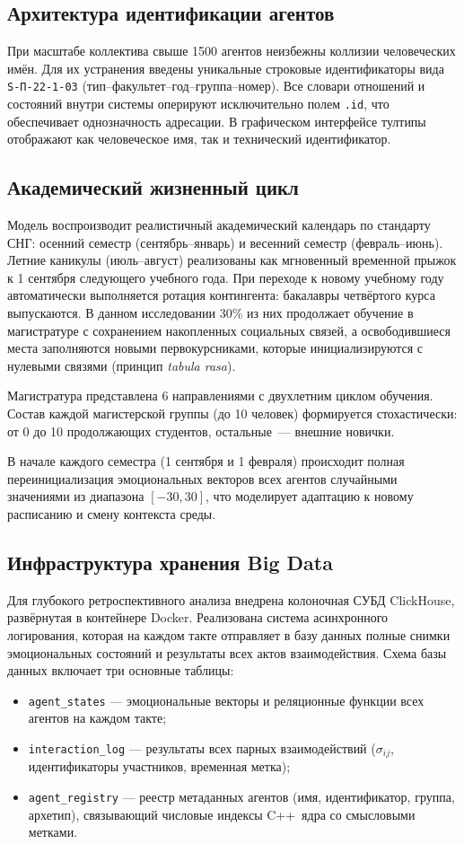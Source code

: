 \documentclass[12pt]{article}
\begin{document}
\subsection{Архитектура идентификации агентов}
При масштабе коллектива свыше 1500 агентов неизбежны коллизии человеческих имён. Для их устранения введены уникальные строковые идентификаторы вида \texttt{S-П-22-1-03} (тип--факультет--год--группа--номер). Все словари отношений и состояний внутри системы оперируют исключительно полем \texttt{.id}, что обеспечивает однозначность адресации. В графическом интерфейсе тултипы отображают как человеческое имя, так и технический идентификатор.

\subsection{Академический жизненный цикл}
Модель воспроизводит реалистичный академический календарь по стандарту СНГ: осенний семестр (сентябрь--январь) и весенний семестр (февраль--июнь). Летние каникулы (июль--август) реализованы как мгновенный временной прыжок к 1 сентября следующего учебного года. При переходе к новому учебному году автоматически выполняется ротация контингента: бакалавры четвёртого курса выпускаются. В данном исследовании 30\% из них продолжает обучение в магистратуре с сохранением накопленных социальных связей, а освободившиеся места заполняются новыми первокурсниками, которые инициализируются с нулевыми связями (принцип \textit{tabula rasa}).

Магистратура представлена 6 направлениями с двухлетним циклом обучения. Состав каждой магистерской группы (до 10 человек) формируется стохастически: от 0 до 10 продолжающих студентов, остальные~--- внешние новички.

В начале каждого семестра (1 сентября и 1 февраля) происходит полная переинициализация эмоциональных векторов всех агентов случайными значениями из диапазона $[-30, 30]$, что моделирует адаптацию к новому расписанию и смену контекста среды.

\subsection{Инфраструктура хранения Big Data}
Для глубокого ретроспективного анализа внедрена колоночная СУБД ClickHouse, развёрнутая в контейнере Docker. Реализована система асинхронного логирования, которая на каждом такте отправляет в базу данных полные снимки эмоциональных состояний и результаты всех актов взаимодействия. Схема базы данных включает три основные таблицы:
\begin{itemize}
    \item \texttt{agent\_states} --- эмоциональные векторы и реляционные функции всех агентов на каждом такте;
    \item \texttt{interaction\_log} --- результаты всех парных взаимодействий ($\sigma_{ij}$, идентификаторы участников, временная метка);
    \item \texttt{agent\_registry} --- реестр метаданных агентов (имя, идентификатор, группа, архетип), связывающий числовые индексы C++~ядра со смысловыми метками.
\end{itemize}
\end{document}

